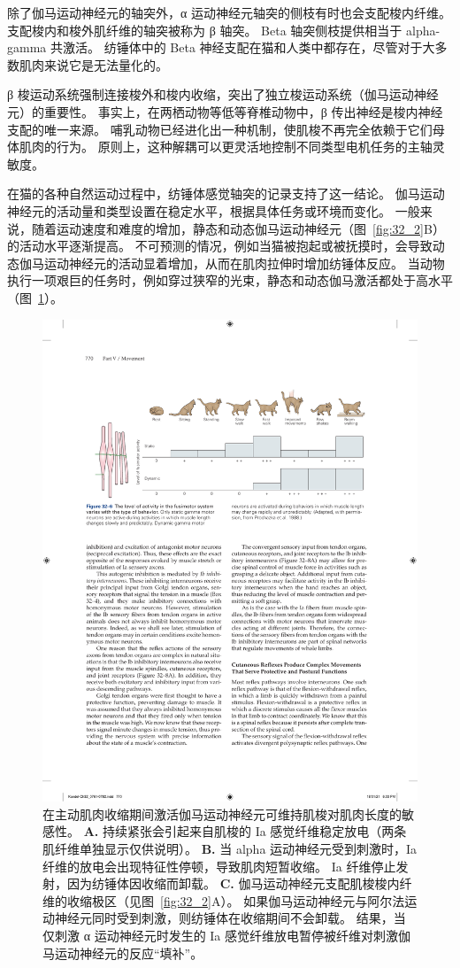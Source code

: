 除了伽马运动神经元的轴突外，α 运动神经元轴突的侧枝有时也会支配梭内纤维。
支配梭内和梭外肌纤维的轴突被称为 β 轴突。
Beta 轴突侧枝提供相当于 alpha-gamma 共激活。
纺锤体中的 Beta 神经支配在猫和人类中都存在，尽管对于大多数肌肉来说它是无法量化的。


β 梭运动系统强制连接梭外和梭内收缩，突出了独立梭运动系统（伽马运动神经元）的重要性。
事实上，在两栖动物等低等脊椎动物中，β 传出神经是梭内神经支配的唯一来源。
哺乳动物已经进化出一种机制，使肌梭不再完全依赖于它们母体肌肉的行为。
原则上，这种解耦可以更灵活地控制不同类型电机任务的主轴灵敏度。


在猫的各种自然运动过程中，纺锤体感觉轴突的记录支持了这一结论。
伽马运动神经元的活动量和类型设置在稳定水平，根据具体任务或环境而变化。
一般来说，随着运动速度和难度的增加，静态和动态伽马运动神经元（图~\ref{fig:32_2}B）的活动水平逐渐提高。
不可预测的情况，例如当猫被抱起或被抚摸时，会导致动态伽马运动神经元的活动显着增加，从而在肌肉拉伸时增加纺锤体反应。 
当动物执行一项艰巨的任务时，例如穿过狭窄的光束，静态和动态伽马激活都处于高水平（图~\ref{fig:32_6}）。


\begin{figure}[htbp]
	\centering
	\includegraphics[width=0.9\linewidth]{chap32/fig_32_6}
	\caption{在主动肌肉收缩期间激活伽马运动神经元可维持肌梭对肌肉长度的敏感性\cite{hunt1951stretch}。 
	\textbf{A.} 持续紧张会引起来自肌梭的 Ia 感觉纤维稳定放电（两条肌纤维单独显示仅供说明）。
	\textbf{B.} 当 alpha 运动神经元受到刺激时，Ia 纤维的放电会出现特征性停顿，导致肌肉短暂收缩。
	Ia 纤维停止发射，因为纺锤体因收缩而卸载。
	\textbf{C.} 伽马运动神经元支配肌梭梭内纤维的收缩极区（见图~\ref{fig:32_2}A）。
	如果伽马运动神经元与阿尔法运动神经元同时受到刺激，则纺锤体在收缩期间不会卸载。
	结果，当仅刺激 α 运动神经元时发生的 Ia 感觉纤维放电暂停被纤维对刺激伽马运动神经元的反应“填补”。}
	\label{fig:32_6}
\end{figure}



